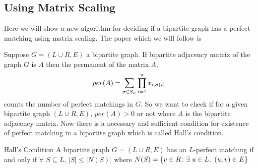 \subsection{Using Matrix Scaling}
Here we will show a new algorithm for deciding if a bipartite graph has a perfect matching using matrix scaling. The paper which we will follow is  \cite{LinialSamorodnitskyWigderson_1998_Ads_CONF}

\begin{algoprob}
\end{algoprob}

Suppose $G=(L\cup R,E)$ a bipartite graph. If  bipartite adjacency matrix of the graph $G$ is $A$ then the permanent of the matrix $A$, $$per(A)=\sum\limits_{\sigma\in S_n}\prod_{i=1}^n x_{i,\sigma(i)}$$ counts the number of perfect matchings in $G$. So we want to check if for a given bipartite graph $(L\cup R,E)$, $per(A)>0$ or not where $A$ is the bipartite adjacency matrix. Now there is a necessary and sufficient condition for existence of perfect matching in a bipartite graph which is called Hall's condition.
\begin{Theorem}{Hall's Condition}{}
	A bipartite graph $G=(L\cup R,E)$ has an $L$-perfect matching if and only if $\forall $ $S\subseteq L$, $|S|\leq |N(S)|$ where $N(S)=\{v\in R\colon \exs\ u\in L,\ (u,v)\in E\}$
\end{Theorem} 
